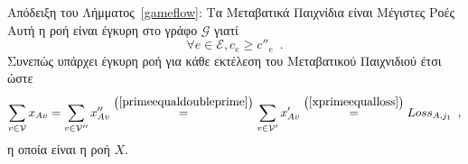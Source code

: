 \begin{sepproof}{Απόδειξη του Λήμματος~\ref{gameflow}: Τα Μεταβατικά Παιχνίδια είναι Μέγιστες Ροές}
  Αυτή η ροή είναι έγκυρη στο γράφο $\mathcal{G}$ γιατί
  \begin{equation*}
    \forall e \in \mathcal{E}, c_e \geq c''_e \enspace.
  \end{equation*}
  Συνεπώς υπάρχει έγκυρη ροή για κάθε εκτέλεση του Μεταβατικού Παιχνιδιού έτσι ώστε
  \begin{equation*}
    \sum\limits_{v \in \mathcal{V}}x_{Av} = \sum\limits_{v \in \mathcal{V}''}x''_{Av}
    \overset{\left(\mbox{\ref{primeequaldoubleprime}}\right)}{=} \sum\limits_{v \in \mathcal{V}'}x'_{Av}
    \overset{\left(\mbox{\ref{xprimeequalloss}}\right)}{=} Loss_{A, j_1} \enspace,
  \end{equation*}
  η οποία είναι η ροή $X$.
\end{sepproof}
